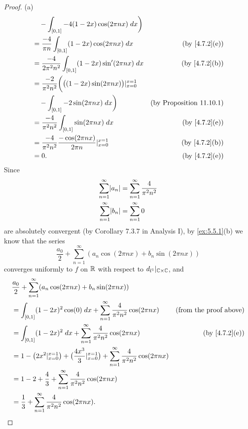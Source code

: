 \begin{proof}{(a)}
\begin{align*}
        & \quad - \int_{[0, 1]} -4 (1 - 2x) \cos(2 \pi n x) \; dx\bigg)                                                      \\
        & = \frac{-4}{\pi n} \int_{[0, 1]} (1 - 2x) \cos(2 \pi n x) \; dx                  & \text{(by \cref{4.7.2}(e))}     \\
        & = \frac{-4}{2 \pi^2 n^2} \int_{[0, 1]} (1 - 2x) \sin'(2 \pi n x) \; dx           & \text{(by \cref{4.7.2}(b))}     \\
        & = \frac{-2}{\pi^2 n^2} \bigg(\big((1 - 2x) \sin(2 \pi n x)\big)|_{x = 0}^{x = 1}                                   \\
        & \quad - \int_{[0, 1]} -2 \sin(2 \pi n x) \; dx\bigg)                             & \text{(by Proposition 11.10.1)} \\
        & = \frac{-4}{\pi^2 n^2} \int_{[0, 1]} \sin(2 \pi n x) \; dx                       & \text{(by \cref{4.7.2}(e))}     \\
        & = \frac{-4}{\pi^2 n^2} \frac{-\cos(2 \pi n x)}{2 \pi n}|_{x = 0}^{x = 1}         & \text{(by \cref{4.7.2}(b))}     \\
        & = 0.                                                                             & \text{(by \cref{4.7.2}(e))}
  \end{align*}
  Since
  \begin{align*}
    \sum_{n = 1}^\infty \abs{a_n} & = \sum_{n = 1}^\infty \frac{4}{\pi^2 n^2} \\
    \sum_{n = 1}^\infty \abs{b_n} & = \sum_{n = 1}^\infty 0
  \end{align*}
  are absolutely convergent (by Corollary 7.3.7 in Analysis I), by \cref{ex:5.5.1}(b) we know that the series
  \[
    \frac{a_0}{2} + \sum_{n = 1}^\infty (a_n \cos(2 \pi n x) + b_n \sin(2 \pi n x))
  \]
  converges uniformly to \(f\) on \(\mathbb{R}\) with respect to \(d_{l^1}|_{\mathbb{C} \times \mathbb{C}}\), and
  \begin{align*}
     & \frac{a_0}{2} + \sum_{n = 1}^\infty (a_n \cos(2 \pi n x) + b_n \sin(2 \pi n x))                                                                                             \\
     & = \int_{[0, 1]} (1 - 2x)^2 \cos(0) \; dx + \sum_{n = 1}^\infty \frac{4}{\pi^2 n^2} \cos(2 \pi n x)                                          & \text{(from the proof above)} \\
     & = \int_{[0, 1]} (1 - 2x)^2 \; dx + \sum_{n = 1}^\infty \frac{4}{\pi^2 n^2} \cos(2 \pi n x)                                                  & \text{(by \cref{4.7.2}(e))}   \\
     & = 1 - \big(2x^2|_{x = 0}^{x = 1}\big) + \big(\frac{4x^3}{3}|_{x = 0}^{x = 1}\big) + \sum_{n = 1}^\infty \frac{4}{\pi^2 n^2} \cos(2 \pi n x)                                 \\
     & = 1 - 2 + \frac{4}{3} + \sum_{n = 1}^\infty \frac{4}{\pi^2 n^2} \cos(2 \pi n x)                                                                                             \\
     & = \frac{1}{3} + \sum_{n = 1}^\infty \frac{4}{\pi^2 n^2} \cos(2 \pi n x).
  \end{align*}
\end{proof}

